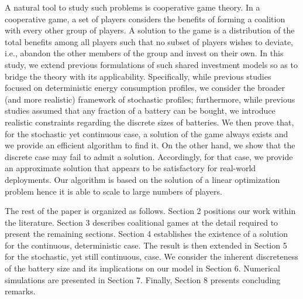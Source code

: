 \documentclass[sigconf, table]{acmart}
\begin{document}
A natural tool to study such problems is cooperative game theory. In a cooperative game, a set of players considers the benefits of forming a coalition with every other group of players. A solution to the game is a distribution of the total benefits among all players such that no subset of players wishes to deviate, i.e., abandon the other members of the group and invest on their own.
In this study, we extend previous formulations of such shared investment models so as to bridge the theory with its applicability. Specifically, while previous studies focused on deterministic energy consumption profiles, we consider the broader (and more realistic) framework of stochastic profiles; furthermore, while previous studies assumed that any fraction of a battery can be bought, we introduce realistic constraints regarding the discrete sizes of batteries.
We then prove that, for the stochastic yet continuous case, a solution of the game always exists and we provide an efficient algorithm to find it. On the other hand, we show that the discrete case may fail to admit a solution. Accordingly, for that case, we provide an approximate solution that appears to be satisfactory for real-world deployments. 
Our algorithm is based on the solution of a linear optimization problem hence it is able to scale to large numbers of players.

The rest of the paper is organized as follows. Section 2 positions our work within the literature. Section 3 describes coalitional games at the detail required to present the remaining sections.
Section 4 establishes the existence of a solution for the continuous, deterministic case. The result is then extended in Section 5 for the stochastic, yet still continuous, case.
We consider the inherent discreteness of the battery size and its implications on our model in Section 6. Numerical simulations are presented in Section 7. Finally, Section 8 presents concluding remarks.
\end{document}
